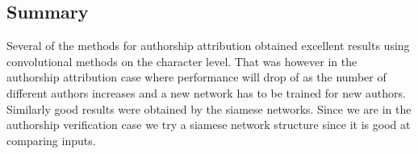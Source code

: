 
\subsection{Summary}

Several of the methods for authorship attribution obtained excellent results
using convolutional methods on the character level. That was however in the
authorship attribution case where performance will drop of as the number of
different authors increases and a new network has to be trained for new authors.
Similarly good results were obtained by the siamese networks. Since we are in
the authorship verification case we try a siamese network structure since it is
good at comparing inputs.
